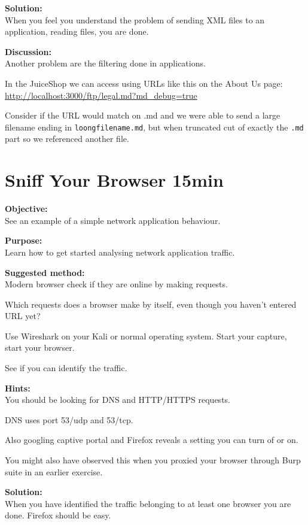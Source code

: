 \documentclass[a4paper,11pt,notitlepage]{report}
\begin{document}
{\bf Solution:}\\
When you feel you understand the problem of sending XML files to an application, reading files, you are done.

{\bf Discussion:}\\
Another problem are the filtering done in applications.

In the JuiceShop we can access using URLs like this on the About Us page:\\
\url{http://localhost:3000/ftp/legal.md?md_debug=true}

Consider if the URL would match on .md and we were able to send a large filename ending in \verb+loongfilename.md+, but when truncated cut of exactly the \verb+.md+ part so we referenced another file.


\chapter{Sniff Your Browser 15min}
\label{ex:sniff-captive-portal}


{\bf Objective:}\\
See an example of a simple network application behaviour.

{\bf Purpose:}\\
Learn how to get started analysing network application traffic.

{\bf Suggested method:}\\
Modern browser check if they are online by making requests.

Which requests does a browser make by itself, even though you haven't entered URL yet?

Use Wireshark on your Kali or normal operating system. Start your capture, start your browser.

See if you can identify the traffic.

{\bf Hints:}\\
You should be looking for DNS and HTTP/HTTPS requests.

DNS uses port 53/udp and 53/tcp.

Also googling captive portal and Firefox reveals a setting you can turn of or on.

You might also have observed this when you proxied your browser through Burp suite in an earlier exercise.

{\bf Solution:}\\
When you have identified the traffic belonging to at least one browser you are done. Firefox should be easy.
\end{document}
